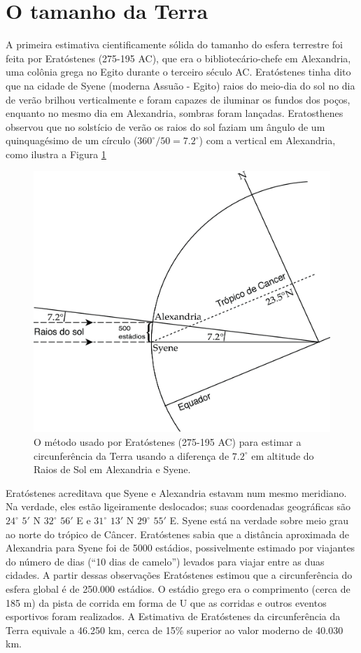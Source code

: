 \documentclass[]{book}
\theoremstyle{definition}
\theoremstyle{definition}
\theoremstyle{definition}
\theoremstyle{remark}
\begin{document}
\hypertarget{o-tamanho-da-terra}{%
\section{O tamanho da Terra}\label{o-tamanho-da-terra}}

A primeira estimativa cientificamente sólida do tamanho do esfera terrestre foi feita por Eratóstenes (275-195 AC), que era o bibliotecário-chefe em Alexandria, uma colônia grega no Egito durante o terceiro século AC. Eratóstenes tinha dito que na cidade de Syene (moderna Assuão - Egito) raios do meio-dia do sol no dia de verão brilhou verticalmente e foram capazes de iluminar os fundos dos poços, enquanto no mesmo dia em Alexandria, sombras foram lançadas. Eratosthenes observou que no solstício de verão os raios do sol faziam um ângulo de um quinquagésimo de um círculo (\(360^\circ /50= 7.2^\circ\)) com a vertical em Alexandria, como ilustra a Figura \ref{fig:raio}

\begin{figure}

{\centering \includegraphics[width=0.4\linewidth]{fig/Fig_02.01} 

}

\caption{O método usado por Eratóstenes (275-195 AC) para estimar a circunferência da Terra usando a diferença de $7.2^\circ$ em altitude do Raios de Sol em Alexandria e Syene.}\label{fig:raio}
\end{figure}

Eratóstenes acreditava que Syene e Alexandria estavam num mesmo meridiano. Na verdade, eles estão ligeiramente deslocados; suas coordenadas geográficas são \(24^\circ\) \(5'\) N \(32^\circ\) \(56'\) E e \(31^\circ\) \(13'\) N \(29^\circ\) \(55'\) E. Syene está na verdade sobre meio grau ao norte do trópico de Câncer. Eratóstenes sabia que a distância aproximada de Alexandria para Syene foi de 5000 estádios, possivelmente estimado por viajantes do número de dias (``10 dias de camelo'') levados para viajar entre as duas cidades. A partir dessas observações Eratóstenes estimou que a circunferência do esfera global é de 250.000 estádios. O estádio grego era o comprimento (cerca de 185 m) da pista de corrida em forma de U que as corridas e outros eventos esportivos foram realizados. A Estimativa de Eratóstenes da circunferência da Terra equivale a 46.250 km, cerca de 15\% superior ao valor moderno de 40.030 km.
\end{document}

